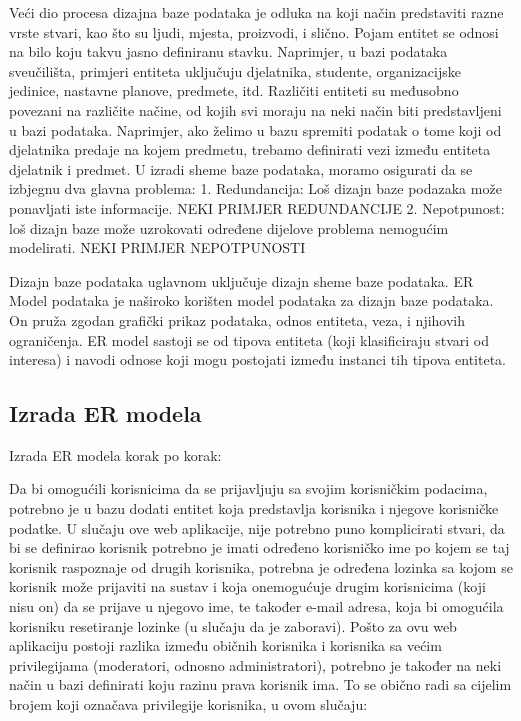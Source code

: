 \documentclass[times, utf8, zavrsni]{fer}
\begin{document}
Veći dio procesa dizajna baze podataka je odluka na koji način predstaviti razne vrste stvari, kao što su ljudi, mjesta, proizvodi, i slično. Pojam entitet se odnosi na bilo koju takvu jasno definiranu stavku. Naprimjer, u bazi podataka sveučilišta, primjeri entiteta uključuju djelatnika, studente, organizacijske jedinice, nastavne planove, predmete, itd. Različiti entiteti su međusobno povezani na različite načine, od kojih svi moraju na neki način biti predstavljeni u bazi podataka. Naprimjer, ako želimo u bazu spremiti podatak o tome koji od djelatnika predaje na kojem predmetu, trebamo definirati vezi između entiteta djelatnik i predmet.
U izradi sheme baze podataka, moramo osigurati da se izbjegnu dva glavna problema:
1. Redundancija: Loš dizajn baze podazaka može ponavljati iste informacije.
NEKI PRIMJER REDUNDANCIJE
2. Nepotpunost: loš dizajn baze može uzrokovati određene dijelove problema nemogućim modelirati.
NEKI PRIMJER NEPOTPUNOSTI

Dizajn baze podataka uglavnom uključuje dizajn sheme baze podataka. ER Model podataka je naširoko korišten model podataka za dizajn baze podataka. On pruža zgodan grafički prikaz podataka, odnos entiteta, veza, i njihovih ograničenja. ER model sastoji se od tipova entiteta (koji klasificiraju stvari od interesa) i navodi odnose koji mogu postojati između instanci tih tipova entiteta.

\subsection{Izrada ER modela}
Izrada ER modela korak po korak:

Da bi omogućili korisnicima da se prijavljuju sa svojim korisničkim podacima, potrebno je u bazu dodati entitet koja predstavlja korisnika i njegove korisničke podatke. U slučaju ove web aplikacije, nije potrebno puno komplicirati stvari, da bi se definirao korisnik potrebno je imati određeno korisničko ime po kojem se taj korisnik raspoznaje od drugih korisnika, potrebna je određena lozinka sa kojom se korisnik može prijaviti na sustav i koja onemogućuje drugim korisnicima (koji nisu on) da se prijave u njegovo ime, te također e-mail adresa, koja bi omogućila korisniku resetiranje lozinke (u slučaju da je zaboravi). Pošto za ovu web aplikaciju postoji razlika između običnih korisnika i korisnika sa većim privilegijama (moderatori, odnosno administratori), potrebno je također na neki način u bazi definirati koju razinu prava korisnik ima. To se obično radi sa cijelim brojem koji označava privilegije korisnika, u ovom slučaju:
\end{document}
